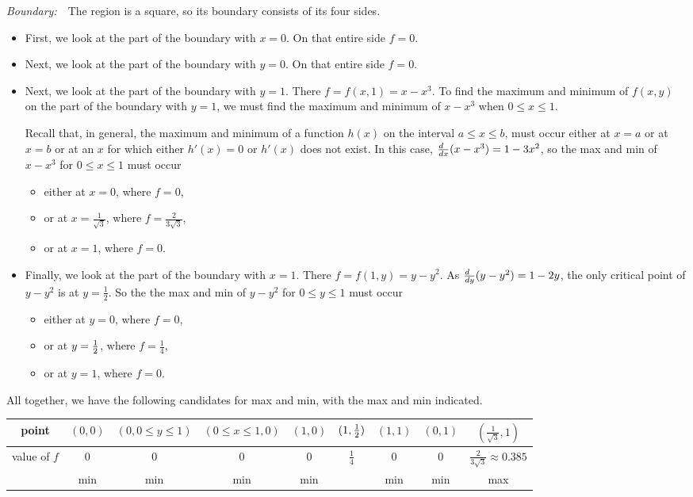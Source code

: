 \begin{eg}
\smallskip
\noindent\emph{Boundary:}\ \ 
The region is a square, so its boundary consists of its four sides.
\begin{itemize}
\item 
First, we look at the part of the boundary with $x=0$. On that entire 
       side $f=0$.
\item 
Next, we look at the part of the boundary with $y=0$. On that entire side 
  $f=0$.
\item
Next, we look at the part of the boundary with $y=1$. There $f=f(x,1)=x-x^3$.
To find the maximum and minimum of $f(x,y)$ on the part of the boundary
with $y=1$, we must find the maximum and minimum of $x-x^3$ when 
 $0\le x\le 1$. 

Recall that, in general, the maximum and minimum of a 
function $h(x)$ on the interval $a\le x\le b$, must occur either at $x=a$ 
or at $x=b$ or at an $x$ for which either 
$h'(x)=0$ or $h'(x)$ does not exist. In this case,
$\tfrac{d\hfill}{dx}(x-x^3)=1-3x^2$, so the max and min of $x-x^3$ for 
$0\le x\le 1$ must occur 
\begin{itemize}\itemsep1pt \parskip0pt 
\item
either at $x=0$, where $f=0$, 
\item 
or at $x=\tfrac{1}{\sqrt{3}}$, where $f=\tfrac{2}{3\sqrt{3}}$, 
\item
or at $x=1$, where $f=0$.
\end{itemize}
\item
 Finally, we look at the part of the boundary with $x=1$. There $f=f(1,y)=y-y^2$.
 As $\tfrac{d\hfill}{dy}(y-y^2)=1-2y$, the only critical point of $y-y^2$
is at $y=\frac{1}{2}$. So the the max and min of $y-y^2$ for $0\le y\le 1$ 
must occur
\begin{itemize}\itemsep1pt \parskip0pt 
\item
 either at $y=0$, where $f=0$, 
\item 
or at $y=\tfrac{1}{2}$,  where $f=\tfrac{1}{4}$, 
\item
or at $y=1$, where $f=0$.
\end{itemize}
\end{itemize}
All together, we have the following candidates for max and min, with the
max and min indicated.
\begin{center}
\renewcommand{\arraystretch}{1.3}
     \begin{tabular}{|c|c|c|c|c|c|c|c|c|}
     \hline
       point
       &$(0,0)$
       &${\scriptstyle(0,0\le y\le 1)}$
       &${\scriptstyle(0\le x\le 1,0)}$  
       &$(1,0)$
       &$(1,\tfrac{1}{2})$
       &$(1,1)$
       &$(0,1)$
       &$(\tfrac{1}{\sqrt{3}},1)$ \\   \hline
       value of $f$
       &0
       &0
       &0
       &0
       &$\tfrac{1}{4}$
       &0
       &0
       &$\tfrac{2}{3\sqrt{3}}\approx0.385$ \\ \hline
       &min
       &min
       &min
       &min
       & 
       &min
       &min
       &max \\ \hline
     \end{tabular}
\renewcommand{\arraystretch}{1.0}
\end{center}


\end{eg}
